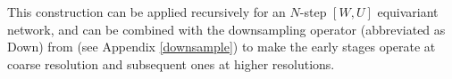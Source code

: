 This construction can be applied recursively for an $N$-step $[W, U]$ equivariant network, and can be combined with the downsampling operator (abbreviated as Down) from \cite{tian2022} (see Appendix \ref{downsample}) to make the early stages operate at coarse resolution and subsequent ones at higher resolutions.


